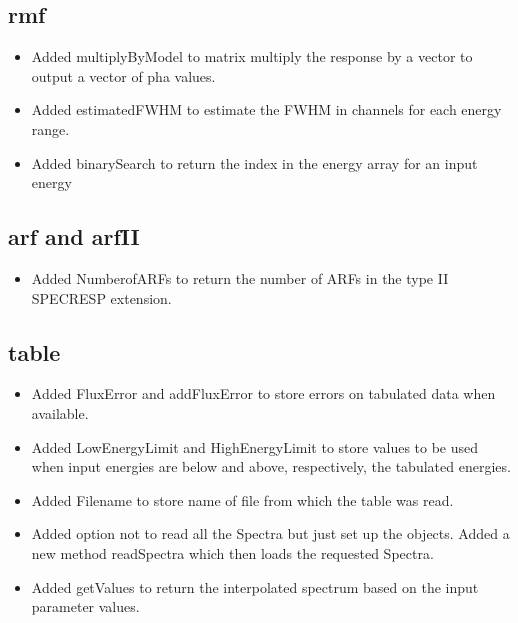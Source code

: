 \documentclass[11pt]{book}
\begin{document}
\subsection{rmf}

\begin{itemize}

\item Added multiplyByModel to matrix multiply the response by a
  vector to output a vector of pha values.

\item Added estimatedFWHM to estimate the FWHM in channels for each
  energy range.

\item Added binarySearch to return the index in the energy array for
  an input energy

\end{itemize}

\subsection{arf and arfII}

\begin{itemize}

\item Added NumberofARFs to return the number of ARFs in the type II
  SPECRESP extension.

\end{itemize}

\subsection{table}

\begin{itemize}

\item Added FluxError and addFluxError to store errors on tabulated
  data when available.

\item Added LowEnergyLimit and HighEnergyLimit to store values to be
  used when input energies are below and above, respectively, the
  tabulated energies.

\item Added Filename to store name of file from which the table was
  read.

\item Added option not to read all the Spectra but just set up the
  objects. Added a new method readSpectra which then loads the
  requested Spectra.

\item Added getValues to return the interpolated spectrum based on the
  input parameter values.

\end{itemize}
\end{document}
